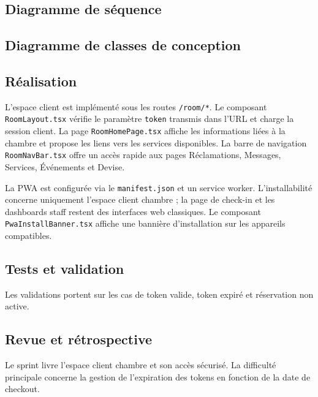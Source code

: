 \subsection{Diagramme de séquence}

\subsection{Diagramme de classes de conception}

\subsection{Réalisation}
L'espace client est implémenté sous les routes \texttt{/room/*}. Le composant \texttt{RoomLayout.tsx} vérifie le paramètre \texttt{token} transmis dans l'URL et charge la session client. La page \texttt{RoomHomePage.tsx} affiche les informations liées à la chambre et propose les liens vers les services disponibles. La barre de navigation \texttt{RoomNavBar.tsx} offre un accès rapide aux pages Réclamations, Messages, Services, Événements et Devise.

La PWA est configurée via le \texttt{manifest.json} et un service worker. L'installabilité concerne uniquement l'espace client chambre ; la page de check-in et les dashboards staff restent des interfaces web classiques. Le composant \texttt{PwaInstallBanner.tsx} affiche une bannière d'installation sur les appareils compatibles.


\subsection{Tests et validation}
Les validations portent sur les cas de token valide, token expiré et réservation non active.

\subsection{Revue et rétrospective}
Le sprint livre l'espace client chambre et son accès sécurisé. La difficulté principale concerne la gestion de l'expiration des tokens en fonction de la date de checkout.



